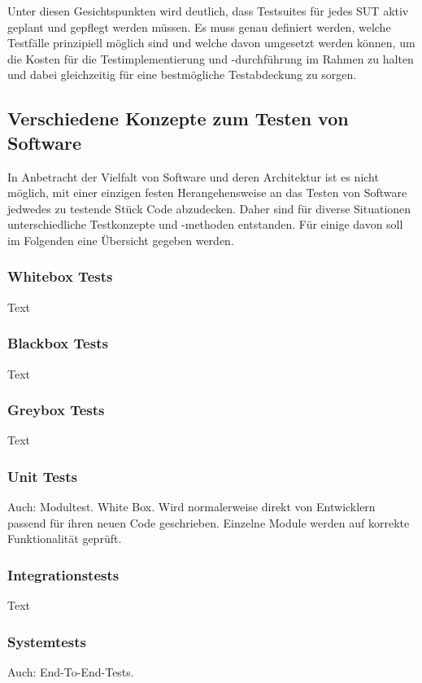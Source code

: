 Unter diesen Gesichtspunkten wird deutlich, dass Testsuites für jedes \ac{SUT} aktiv geplant und gepflegt werden müssen. Es muss genau definiert werden, welche Testfälle prinzipiell möglich sind und welche davon umgesetzt werden können, um die Kosten für die Testimplementierung und -durchführung im Rahmen zu halten und dabei gleichzeitig für eine bestmögliche Testabdeckung zu sorgen.

\subsection{Verschiedene Konzepte zum Testen von Software}\label{subsec:testkonzepte}
In Anbetracht der Vielfalt von Software und deren Architektur ist es nicht möglich, mit einer einzigen festen Herangehensweise an das Testen von Software jedwedes zu testende Stück Code abzudecken. Daher sind für diverse Situationen unterschiedliche Testkonzepte und -methoden entstanden. Für einige davon soll im Folgenden eine Übersicht gegeben werden.

\subsubsection*{Whitebox Tests}\label{subsubsec:whitebox}
Text

\subsubsection*{Blackbox Tests}\label{subsubsec:blackbox}
Text

\subsubsection*{Greybox Tests}\label{subsubsec:greybox}
Text

\subsubsection*{Unit Tests}\label{subsubsec:unittest}
Auch: Modultest. White Box. Wird normalerweise direkt von Entwicklern passend für ihren neuen Code geschrieben. Einzelne Module werden auf korrekte Funktionalität geprüft. \cite[S. 75]{witte:2019}

\subsubsection*{Integrationstests} \label{subsubsec:integrationstests}
Text

\subsubsection*{Systemtests}\label{subsubsec:e2etests}
Auch: End-To-End-Tests.

